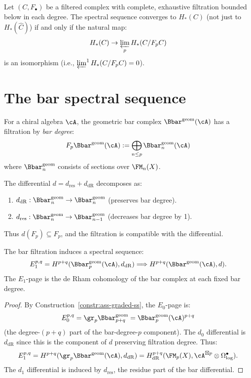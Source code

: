 \begin{proposition}
\label{prop:complete-filt-convergence}
Let $(C, F_\bullet)$ be a filtered complex with complete, exhaustive filtration
bounded below in each degree. The spectral sequence converges to $H_*(C)$
(not just to $H_*(\widehat{C})$) if and only if the natural map:
\[
H_*(C) \to \varprojlim_p H_*(C / F_p C)
\]
is an isomorphism (i.e., $\varprojlim^1 H_*(C / F_p C) = 0$).
\end{proposition}


\section{The bar spectral sequence}
\label{sec:bar-spectral-sequence}


\begin{construction}
\label{constr:bar-filtration}
For a chiral algebra $\cA$, the geometric bar complex $\Bbar^{\mathrm{geom}}(\cA)$
has a filtration by \emph{bar degree}:
\[
F_p \Bbar^{\mathrm{geom}}(\cA) := \bigoplus_{n \leq p} \Bbar^{\mathrm{geom}}_n(\cA)
\]
where $\Bbar^{\mathrm{geom}}_n$ consists of sections over $\FM_n(X)$.

The differential $d = d_{\mathrm{res}} + d_{\mathrm{dR}}$ decomposes as:
\begin{enumerate}[label=(\roman*)]
\item $d_{\mathrm{dR}}: \Bbar^{\mathrm{geom}}_n \to \Bbar^{\mathrm{geom}}_n$ (preserves bar degree).
\item $d_{\mathrm{res}}: \Bbar^{\mathrm{geom}}_n \to \Bbar^{\mathrm{geom}}_{n-1}$ (decreases bar degree by 1).
\end{enumerate}
Thus $d(F_p) \subseteq F_p$, and the filtration is compatible with the differential.
\end{construction}

\begin{theorem}
\label{thm:bar-ss}
The bar filtration induces a spectral sequence:
\[
E_1^{p,q} = H^{p+q}(\Bbar^{\mathrm{geom}}_p(\cA), d_{\mathrm{dR}})
\Longrightarrow H^{p+q}(\Bbar^{\mathrm{geom}}(\cA), d).
\]
The $E_1$-page is the de Rham cohomology of the bar complex at each fixed
bar degree.
\end{theorem}

\begin{proof}
By Construction~\ref{constr:ass-graded-ss}, the $E_0$-page is:
\[
E_0^{p,q} = \gr_p \Bbar^{\mathrm{geom}}_{p+q} = \Bbar^{\mathrm{geom}}_p(\cA)^{p+q}
\]
(the degree-$(p+q)$ part of the bar-degree-$p$ component). The $d_0$ differential
is $d_{\mathrm{dR}}$ since this is the component of $d$ preserving filtration
degree. Thus:
\[
E_1^{p,q} = H^{p+q}(\gr_p \Bbar^{\mathrm{geom}}(\cA), d_{\mathrm{dR}})
 = H^{p+q}_{\mathrm{dR}}(\FM_p(X), \cA^{\boxtimes p} \otimes \Omega^\bullet_{\log}).
\]
The $d_1$ differential is induced by $d_{\mathrm{res}}$, the residue part of the
bar differential.
\end{proof}

